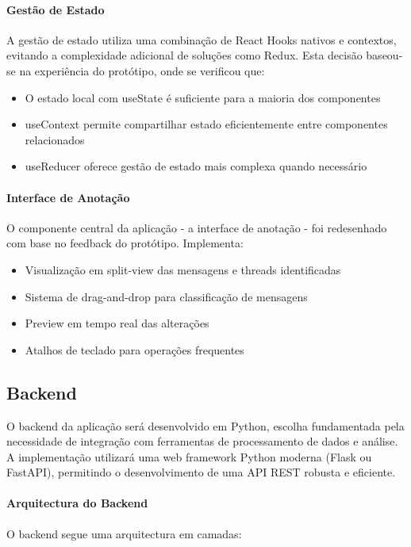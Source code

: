 \paragraph{Gestão de Estado}
A gestão de estado utiliza uma combinação de React Hooks nativos e contextos, evitando a complexidade adicional de soluções como Redux. Esta decisão baseou-se na experiência do protótipo, onde se verificou que:

\begin{itemize}
    \item O estado local com useState é suficiente para a maioria dos componentes
    \item useContext permite compartilhar estado eficientemente entre componentes relacionados
    \item useReducer oferece gestão de estado mais complexa quando necessário
\end{itemize}

\paragraph{Interface de Anotação}
O componente central da aplicação - a interface de anotação - foi redesenhado com base no feedback do protótipo. Implementa:

\begin{itemize}
    \item Visualização em split-view das mensagens e threads identificadas
    \item Sistema de drag-and-drop para classificação de mensagens
    \item Preview em tempo real das alterações
    \item Atalhos de teclado para operações frequentes
\end{itemize}

\subsection{Backend}

O backend da aplicação será desenvolvido em Python, escolha fundamentada pela necessidade de integração com ferramentas de processamento de dados e análise. A implementação utilizará uma web framework Python moderna (Flask ou FastAPI), permitindo o desenvolvimento de uma API REST robusta e eficiente.

\paragraph{Arquitectura do Backend}
O backend segue uma arquitectura em camadas:

